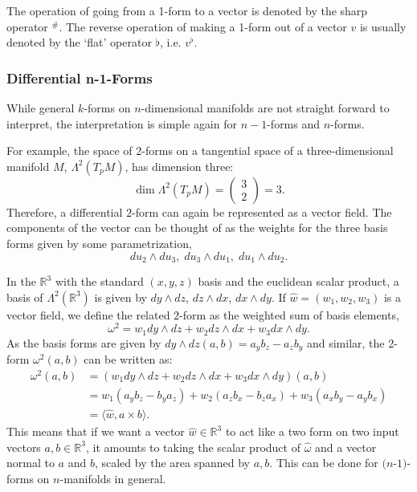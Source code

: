 The operation of going from a 1-form to a vector is denoted by the sharp operator $^\#$. The reverse operation of making a 1-form out of a vector $v$ is usually denoted by the `flat' operator $\flat$, i.e. $v^\flat$. 

\subsubsection*{Differential n-1-Forms}
While general $k$-forms on $n$-dimensional manifolds are not straight forward to interpret, the interpretation is simple again for $n-1$-forms and $n$-forms.

For example, the space of 2-forms on a tangential space of a three-dimensional manifold $M$,  $\Lambda^2(T_pM)$, has dimension three:
\[\dim\Lambda^2(T_pM) =\begin{pmatrix}
3\\
2
\end{pmatrix} =3.\] 
Therefore, a differential $2$-form can again be represented as a vector field. The components of the vector can be thought of as the weights for the three basis forms given by some parametrization,
\[du_2\wedge du_3,\;
du_3\wedge du_1,\;
du_1\wedge du_2.\]

In the $\mathbb R^3$ with the standard $(x,y,z)$ basis and the euclidean scalar product, a basis of $\Lambda^2(\mathbb R^3)$ is given by $dy \wedge dz$, $dz \wedge dx$, $dx \wedge dy$. If $\widehat{w} = (w_1,w_2,w_3)$ is a vector field, we define the related $2$-form as the weighted sum of basis elements,
\[\omega^2 = w_1 dy \wedge dz + w_2 dz \wedge dx + w_3 dx \wedge dy. \]
 As the basis forms are given by $dy \wedge dz (a,b) = a_yb_z -a_zb_y$ and similar, the 2-form $\omega^2(a,b)$ can be written as:
\begin{align*}
\omega^2(a,b) &= (w_1 dy \wedge dz + w_2 dz \wedge dx + w_3 dx \wedge dy)(a,b) \\
&= w_1(a_yb_z - b_y a_z) + w_2(a_zb_x-b_za_x) + w_3(a_xb_y - a_yb_x) \\
&= \langle \widehat{w}, a \times b \rangle.\end{align*} 
This means that if we want a vector $\widehat{w} \in \mathbb R^3$ to act like a two form on two input vectors $a,b \in \mathbb R^3$, it amounts to taking the scalar product of $\widehat{\omega}$ and a vector normal to $a$ and $b$, scaled by the area spanned by $a,b$. 
This can be done for $(n$-$1)$-forms on $n$-manifolds in general.


